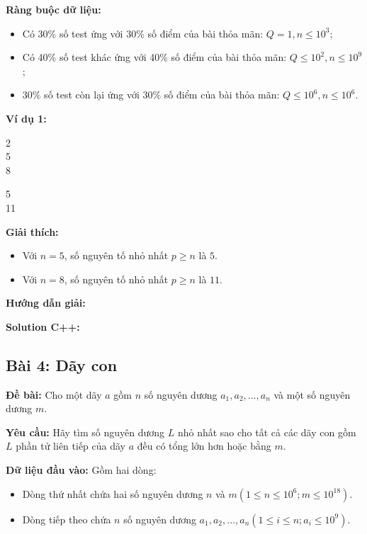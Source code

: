 \documentclass[12pt]{scrartcl}  %
\begin{document}
\textbf{Ràng buộc dữ liệu:}
\begin{itemize}
    \item Có 30\% số test ứng với 30\% số điểm của bài thỏa mãn: $Q = 1, n \leq 10^3$;
    \item Có 40\% số test khác ứng với 40\% số điểm của bài thỏa mãn: $Q \leq 10^2, n \leq 10^9$;
    \item 30\% số test còn lại ứng với 30\% số điểm của bài thỏa mãn: $Q \leq 10^6, n \leq 10^6$.
\end{itemize}

\textbf{Ví dụ 1:}
\begin{tcolorbox}[colback=gray!5!white, colframe=blue!50!black, title=Input]
2\\
5\\
8
\end{tcolorbox}
\begin{tcolorbox}[colback=gray!5!white, colframe=green!50!black, title=Output]
5\\
11
\end{tcolorbox}

\textbf{Giải thích:}
\begin{itemize}
    \item Với $n = 5$, số nguyên tố nhỏ nhất $p \geq n$ là $5$.
    \item Với $n = 8$, số nguyên tố nhỏ nhất $p \geq n$ là $11$.
\end{itemize}

\textbf{Hướng dẫn giải:}

\textbf{Solution C++:}

\subsection{Bài 4: Dãy con}
\textbf{Đề bài:}
Cho một dãy $a$ gồm $n$ số nguyên dương $a_1, a_2, ..., a_n$ và một số nguyên dương $m$.

\textbf{Yêu cầu:}
Hãy tìm số nguyên dương $L$ nhỏ nhất sao cho tất cả các dãy con gồm $L$ phần tử liên tiếp của dãy $a$ đều có tổng lớn hơn hoặc bằng $m$.

\textbf{Dữ liệu đầu vào:}
Gồm hai dòng:
\begin{itemize}
    \item Dòng thứ nhất chứa hai số nguyên dương $n$ và $m (1 \leq n \leq 10^6; m \leq 10^{18})$.
    \item Dòng tiếp theo chứa $n$ số nguyên dương $a_1, a_2, ..., a_n (1 \leq i \leq n; a_i \leq 10^9)$.
\end{itemize}
\end{document}
